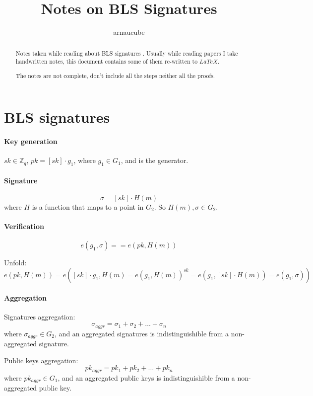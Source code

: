 \documentclass{article}
\title{Notes on BLS Signatures}
\author{arnaucube}
\date{}
\theoremstyle{definition}
\begin{document}
\maketitle

\begin{abstract}
	Notes taken while reading about BLS signatures \cite{bls-sig-eth2}. Usually while reading papers I take handwritten notes, this document contains some of them re-written to $LaTeX$.

	The notes are not complete, don't include all the steps neither all the proofs.
\end{abstract}


\section{BLS signatures}

\paragraph{Key generation}
$sk \in \mathbb{Z}_q$, $pk = [sk] \cdot g_1$, where $g_1 \in G_1$, and is the generator.

\paragraph{Signature}
$$\sigma = [sk] \cdot H(m)$$
where $H$ is a function that maps to a point in $G_2$. So $H(m), \sigma \in G_2$.

\paragraph{Verification}
$$e(g_1, \sigma) == e(pk, H(m))$$

Unfold:
$$e(pk, H(m)) = e([sk] \cdot g_1, H(m) = e(g_1, H(m))^{sk} = e(g_1, [sk] \cdot H(m)) = e(g_1, \sigma))$$

\paragraph{Aggregation}
Signatures aggregation:
$$\sigma_{aggr} = \sigma_1 + \sigma_2 + \ldots + \sigma_n$$
where $\sigma_{aggr} \in G_2$, and an aggregated signatures is indistinguishible from a non-aggregated signature.

\vspace{0.5cm}
Public keys aggregation:
$$pk_{aggr} = pk_1 + pk_2 + \ldots + pk_n$$
where $pk_{aggr} \in G_1$, and an aggregated public keys is indistinguishible from a non-aggregated public key.
\end{document}
